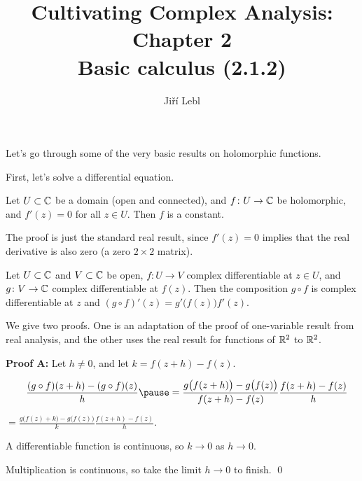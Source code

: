 \documentclass[10pt,aspectratio=169]{beamer}
\author{Ji\v{r}\'i Lebl}
\institute[OSU]{%
Departemento pri Matematiko de Oklahoma {\^S}tata Universitato}
\title{Cultivating Complex Analysis: Chapter 2\\%
Basic calculus (2.1.2)}
\date{}
\begin{document}
\begin{frame}
\titlepage
\end{frame}

\begin{frame}
Let's go through some of the very basic results on holomorphic functions.

\medskip
\pause

First, let's solve a differential equation.

\pause

\begin{proposition}
Let $U \subset {\mathbb{C}}$ be a domain (open and connected),
and $f \colon U \to {\mathbb{C}}$ be holomorphic, and $f'(z) = 0$ for all $z \in U$.
Then $f$ is a constant.
\end{proposition}

\pause

The proof is just the standard real result, since $f'(z)=0$ implies that
the real derivative is also zero (a zero $2 \times 2$ matrix).
\end{frame}

\begin{frame}
\begin{proposition} 
Let $U \subset {\mathbb{C}}$ and $V \subset {\mathbb{C}}$ be open, $f \colon U \to V$
complex differentiable at $z \in U$, and $g \colon V \to {\mathbb{C}}$ complex differentiable
at $f(z)$.  Then the composition $g \circ f$
is complex differentiable at $z$ and $(g \circ f)'(z) = g'\bigl(f(z)\bigr) f'(z)$.
\end{proposition}

\pause

We give two proofs.  One is an adaptation of the proof of one-variable result
from real analysis, and the other uses the real result for functions of ${\mathbb{R}}^2$
to ${\mathbb{R}}^2$.

\medskip
\pause

\textbf{Proof A:}
Let $h \not= 0$, and let $k = f(z+h) -f(z)$.

\medskip
\pause

$\displaystyle
\qquad
\frac{(g \circ f)(z+h) - (g \circ f)(z)}{h}
\pause
 =
\frac{g \bigl( f(z+h) \bigr) - g\bigl( f(z) \bigr)}{f(z+h)-f(z)}
\frac{f(z+h)-f(z)}{h}
$

\pause
\medskip

%
$\displaystyle
=
\frac{g \bigl( f(z) + k \bigr) - g\bigl( f(z) \bigr)}{k}
\frac{f(z+h)-f(z)}{h} .
$

\medskip
\pause

A differentiable function is continuous, so $k \to 0$ as $h \to 0$.
\pause

Multiplication is continuous, so take the limit $h \to 0$ to finish.
\qed

\end{frame}
\end{document}
